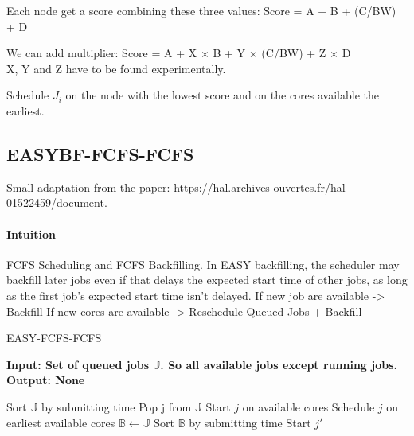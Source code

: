 \documentclass[a4paper]{article}
\newcommand{\Node}[1]{\ensuremath{\mathrm{Node}_{#1}}\xspace}
\newcommand{\inputs}{\ensuremath{\mathcal{F}}\xspace}
\newcommand{\memory}{\ensuremath{\mathcal{M}}\xspace}
\newcommand{\jobset}{\ensuremath{\mathbb{J}}\xspace}
\begin{document}
Each node get a score combining these three values: Score = A + B + (C/BW) + D

We can add multiplier: Score = A + X $\times$ B + Y $\times$ (C/BW) + Z $\times$ D\\
X, Y and Z have to be found experimentally.

Schedule $J_i$ on the node with the lowest score and on the cores available the earliest.



\subsection{EASYBF-FCFS-FCFS}
Small adaptation from the paper: \url{https://hal.archives-ouvertes.fr/hal-01522459/document}.
\paragraph{Intuition}
FCFS Scheduling and FCFS Backfilling.
In EASY backfilling, the scheduler may backfill later jobs even if that delays the expected start time of other jobs, as long as the first job's expected start time isn't delayed. 
If new job are available -> Backfill
If new cores are available -> Reschedule Queued Jobs + Backfill
\begin{algorithm}[H]
\caption{EASY-FCFS-FCFS}
\hspace*{\algorithmicindent} \textbf{Input: Set of queued jobs $\jobset$. So all available jobs except running jobs.} \\
\hspace*{\algorithmicindent} \textbf{Output: None}
\begin{algorithmic}[1]
\State Sort $\jobset$ by submitting time
\State Pop j from $\jobset$
	\State Start $j$ on available cores
\Else
	\State Schedule $j$ on earliest available cores 
	\State $\mathbb{B} \gets \jobset$
	\State Sort $\mathbb{B}$ by submitting time 
		 
			\State Start $j'$
		\EndIf
	\EndFor
\EndIf		
\end{algorithmic}
\end{algorithm}
\end{document}
